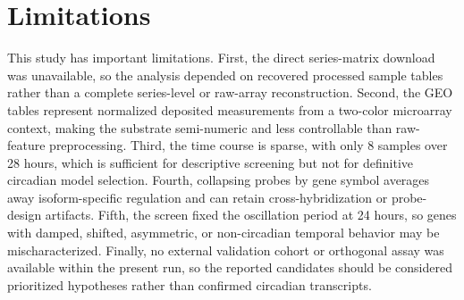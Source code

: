 \documentclass[11pt]{article}
\begin{document}
\section{Limitations}
This study has important limitations. First, the direct series-matrix download was unavailable, so the analysis depended on recovered processed sample tables rather than a complete series-level or raw-array reconstruction. Second, the GEO tables represent normalized deposited measurements from a two-color microarray context, making the substrate semi-numeric and less controllable than raw-feature preprocessing. Third, the time course is sparse, with only 8 samples over 28 hours, which is sufficient for descriptive screening but not for definitive circadian model selection. Fourth, collapsing probes by gene symbol averages away isoform-specific regulation and can retain cross-hybridization or probe-design artifacts. Fifth, the screen fixed the oscillation period at 24 hours, so genes with damped, shifted, asymmetric, or non-circadian temporal behavior may be mischaracterized. Finally, no external validation cohort or orthogonal assay was available within the present run, so the reported candidates should be considered prioritized hypotheses rather than confirmed circadian transcripts.



\end{document}
